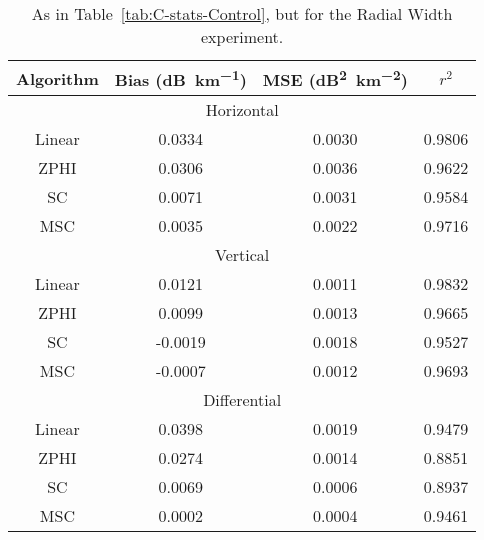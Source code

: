 \begin{table}
    \centering
    \begin{tabular}{| c | c | c | c |}
        \hline
        Algorithm & Bias (\si{dB\per \kilo\meter}) & MSE (\si{dB\squared \per \kilo\meter \squared}) & $r^2$ \\
        \hline
        \hline
        \multicolumn{4}{|c|}{Horizontal}\\
        \hline
        Linear & 0.0334 & 0.0030 & 0.9806\\
        ZPHI & 0.0306 & 0.0036 & 0.9622\\
        SC & 0.0071 & 0.0031 & 0.9584\\
        MSC & 0.0035 & 0.0022 & 0.9716\\
        \hline
        \multicolumn{4}{|c|}{Vertical}\\
        \hline
        Linear & 0.0121 & 0.0011 & 0.9832\\
        ZPHI & 0.0099 & 0.0013 & 0.9665\\
        SC & -0.0019 & 0.0018 & 0.9527\\
        MSC & -0.0007 & 0.0012 & 0.9693\\
        \hline
        \multicolumn{4}{|c|}{Differential}\\
        \hline
        Linear & 0.0398 & 0.0019 & 0.9479\\
        ZPHI & 0.0274 & 0.0014 & 0.8851\\
        SC & 0.0069 & 0.0006 & 0.8937\\
        MSC & 0.0002 & 0.0004 & 0.9461\\
\hline
    \end{tabular}
    \caption{As in Table~\ref{tab:C-stats-Control}, but for
    the Radial Width experiment.}
    \label{tab:C-stats-Radial Width}
\end{table}
